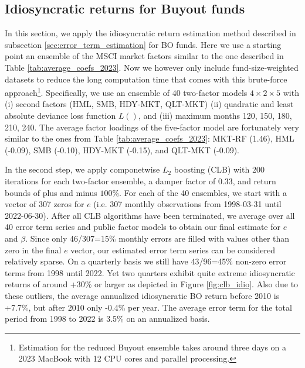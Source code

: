 \documentclass[12pt]{article}
\begin{document}
\subsection{Idiosyncratic returns for Buyout funds}
\label{sec:idiosyncratic_BO}

In this section, we apply the idiosyncratic return estimation method described in subsection \ref{sec:error_term_estimation} for BO funds.
Here we use a starting point an ensemble of the MSCI market factors similar to the one described in Table \ref{tab:average_coefs_2023}.
Now we however only include fund-size-weighted datasets to reduce the long computation time that comes with this brute-force approach\footnote{Estimation for the reduced Buyout ensemble takes around three days on a 2023 MacBook with 12 CPU cores and parallel processing.}.
Specifically, we use an ensemble of 40 two-factor models $4 \times 2 \times 5$  with (i) second factors (HML, SMB, HDY-MKT, QLT-MKT) (ii) quadratic and least absolute deviance loss function $L()$, and (iii) maximum months 120, 150, 180, 210, 240.
The average factor loadings of the five-factor model are fortunately very similar to the ones from Table \ref{tab:average_coefs_2023}:  
MKT-RF (1.46), 
HML (-0.09), 
SMB (-0.10), 
HDY-MKT (-0.15), and 
QLT-MKT (-0.09).

In the second step, we apply componetwise $L_2$ boosting (CLB) with 200 iterations for each two-factor ensemble, a damper factor of 0.33, and return bounds of plus and minus $100\%$.
For each of the 40 ensembles, we start with a vector of 307 zeros for $e$  (i.e. 307 monthly observations from 1998-03-31 until 2022-06-30).
After all CLB algorithms have been terminated, we average over all 40 error term series and public factor models to obtain our final estimate for $e$ and $\beta$.
Since only 46/307=15\% monthly errors are filled with values other than zero in the final $e$ vector, our estimated error term series can be considered relatively sparse.
On a quarterly basis we still have 43/96=45\% non-zero error terms from 1998 until 2022.
Yet two quarters exhibit quite extreme idiosyncratic returns of around +30\% or larger as depicted in Figure \ref{fig:clb_idio}.
Also due to these outliers, the average annualized idiosyncratic BO return before 2010 is +7.7\%, but after 2010 only -0.4\% per year.
The average error term for the total period from 1998 to 2022 is 3.5\% on an annualized basis.
\end{document}
